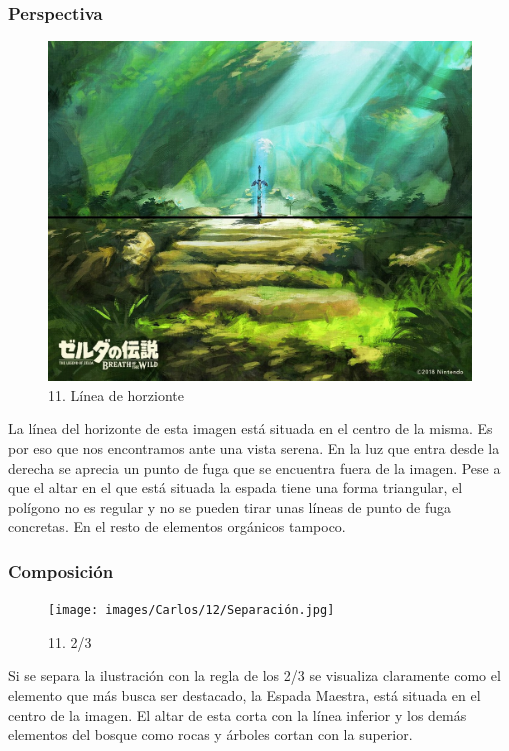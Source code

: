 \documentclass[12pt]{article}
\begin{document}
            \subsubsection{Perspectiva}
            \begin{figure}[H]
      \centering
      \includegraphics[width=\textwidth]{images/Carlos/12/Horizonte.jpg}
      \caption{\small 11. Línea de horzionte}
    \end{figure}
    La línea del horizonte de esta imagen está situada en el centro de la misma. Es por eso que nos encontramos ante una vista serena. En la luz que entra desde la derecha se aprecia un punto de fuga que se encuentra fuera de la imagen. Pese a que el altar en el que está situada la espada tiene una forma triangular, el polígono no es regular y no se pueden tirar unas líneas de punto de fuga concretas. En el resto de elementos orgánicos tampoco.
            \subsubsection{Composición}
            \begin{figure}[H]
      \centering
      \texttt{[image: images/Carlos/12/Separación.jpg]}
      \caption{\small 11. 2/3}
    \end{figure}
    Si se separa la ilustración con la regla de los 2/3 se visualiza claramente como el elemento que más busca ser destacado, la Espada Maestra, está situada en el centro de la imagen. El altar de esta corta con la línea inferior y los demás elementos del bosque como rocas y árboles cortan con la superior.
\end{document}
